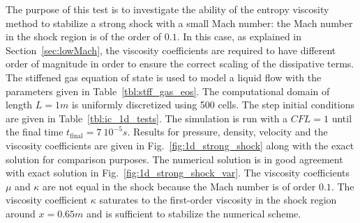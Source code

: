 \documentclass[preprint,10pt]{elsarticle}
\newcommand{\fig}[1]{Fig.~\ref{#1}}                      %
\newcommand{\tbl}[1]{Table~\ref{#1}}                     %
\newcommand{\sct}[1]{Section~\ref{#1}}                   %
\begin{document}
The purpose of this test is to investigate the ability of the entropy viscosity method to stabilize a strong shock with a small Mach number: the Mach number in the shock region is of the order of $0.1$. In this case, as explained in \sct{sec:lowMach}, the viscosity coefficients are required to have different order of magnitude in order to ensure the correct scaling of the dissipative terms.   
%
The stiffened gas equation of state is used to model a liquid flow with the parameters given in \tbl{tbl:stff_gas_eos}. The computational domain of length $L=1m$ is uniformly discretized using 500 cells. The step initial conditions are given in \tbl{tbl:ic_1d_tests}.
%
The simulation is run with a $CFL=1$ until the final time $t_{\text{final}} = 7 \ 10^{-5}s$. Results for pressure, density, velocity and the viscosity coefficients are given in \fig{fig:1d_strong_shock} along with the exact solution for comparison purposes. The numerical solution is in good agreement with exact solution in \fig{fig:1d_strong_shock_var}. The viscosity coefficients $\mu$ and $\kappa$ are not equal in the shock because the Mach number is of order $0.1$. The viscosity coefficient $\kappa$ saturates to the first-order viscosity in the shock region around $x = 0.65m$ and is sufficient to stabilize the numerical scheme. 
%
\end{document}
